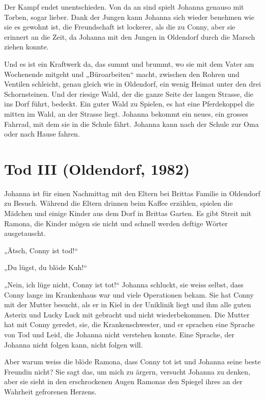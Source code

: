Der Kampf endet unentschieden. Von da an sind spielt Johanna genauso mit Torben, sogar lieber. Dank der Jungen kann Johanna sich wieder benehmen wie sie es gewohnt ist, die Freundschaft ist lockerer, als die zu Conny, aber sie erinnert an die Zeit, da Johanna mit den Jungen in Oldendorf durch die Marsch ziehen konnte.

 Und es ist ein Kraftwerk da, das summt und brummt, wo sie mit dem Vater am Wochenende mitgeht und „Büroarbeiten“ macht, zwischen den Rohren und Ventilen schleicht, genau gleich wie in Oldendorf, ein wenig Heimat unter den drei Schornsteinen.  Und der riesige Wald, der die ganze Seite der langen Strasse, die ins Dorf führt, bedeckt. Ein guter Wald zu Spielen, es hat eine Pferdekoppel die mitten im Wald, an der Strasse liegt.
Johanna bekommt ein neues, ein grosses Fahrrad, mit dem sie in die Schule fährt. Johanna kann nach der Schule zur Oma oder nach Hause fahren. 



\section*{Tod III (Oldendorf, 1982)}




Johanna ist für einen Nachmittag mit den Eltern bei Brittas Familie in Oldendorf zu Besuch. Während die Eltern drinnen beim Kaffee erzählen, spielen die Mädchen und einige Kinder aus dem Dorf in Brittas Garten. Es gibt Streit mit Ramona, die Kinder mögen sie nicht und schnell werden  deftige Wörter ausgetauscht.  

„Ätsch, Conny ist tod!“

„Du lügst, du blöde Kuh!“

„Nein, ich lüge nicht, Conny ist tot!“ Johanna schluckt, sie weiss selbst, dass Conny lange im Krankenhaus war und viele Operationen bekam. Sie hat Conny mit der Mutter besucht, als er in Kiel in der Uniklinik liegt und ihm alle guten Asterix und Lucky Luck mit gebracht und  nicht wiederbekommen. Die Mutter hat mit Conny geredet, sie, die Krankenschwester, und er sprachen eine Sprache von Tod und Leid, die Johanna nicht verstehen konnte. Eine Sprache, der Johanna nicht folgen kann, nicht folgen will.

Aber warum weiss die blöde Ramona, dass Conny tot ist und Johanna seine beste Freundin nicht? Sie sagt das, um mich zu ärgern, versucht  Johanna zu denken, aber sie sieht in den erschrockenen Augen Ramonas den Spiegel ihres an der Wahrheit gefrorenen Herzens.

